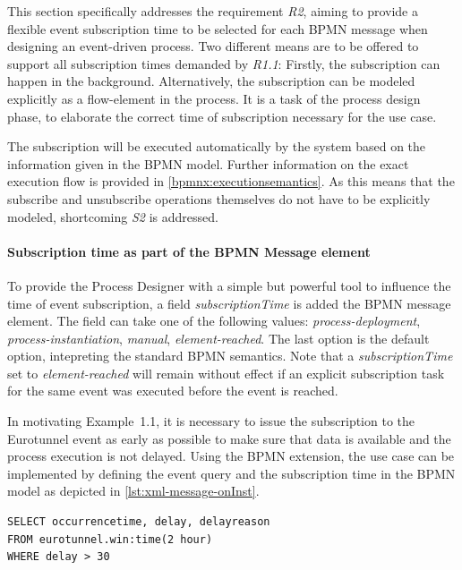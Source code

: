 This section specifically addresses the requirement \textit{R2}, aiming to provide a flexible event subscription time to be selected for each BPMN message when designing an event-driven process.
Two different means are to be offered to support all subscription times demanded by \textit{R1.1}: Firstly, the subscription can happen in the background. Alternatively, the subscription can be modeled explicitly as a flow-element in the process.
It is a task of the process design phase, to elaborate the correct time of subscription necessary for the use case.

The subscription will be executed automatically by the system based on the information given in the BPMN model. Further information on the exact execution flow is provided in \autoref{bpmnx:executionsemantics}.
As this means that the subscribe and unsubscribe operations themselves do not have to be explicitly modeled, shortcoming \textit{S2} is addressed.



\paragraph{Subscription time as part of the BPMN Message element\newline}
To provide the Process Designer with a simple but powerful tool to influence the time of event subscription, a field \textit{subscriptionTime} is added the BPMN message element. 
The field can take one of the following values: \textit{process-deployment}, \textit{process-instantiation}, \textit{manual}, \textit{element-reached}. The last option is the default option, intepreting the standard BPMN semantics.
Note that a \textit{subscriptionTime} set to \textit{element-reached} will remain without effect if an explicit subscription task for the same event was executed before the event is reached.

In motivating Example~1.1, it is necessary to issue the subscription to the Eurotunnel event as early as possible to make sure that data is available and the process execution is not delayed.
Using the BPMN extension, the use case can be implemented by defining the event query and the subscription time in the BPMN model as depicted in \autoref{lst:xml-message-onInst}.

\begin{lstlisting}[caption={XML representation of an extended BPMN Message element},label=lst:xml-message-onInst]
SELECT occurrencetime, delay, delayreason 
FROM eurotunnel.win:time(2 hour)
WHERE delay > 30



\end{lstlisting}


